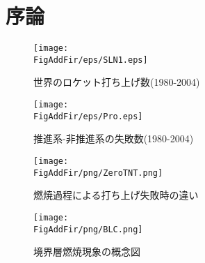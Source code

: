 \chapter{序論}
\newcommand{\FigAddFir}{./src/Chapter1/Figure}




\begin{figure}
\centering
\texttt{[image: \\FigAddFir/eps/SLN1.eps]}
\caption{世界のロケット打ち上げ数(1980-2004)}
\label{fig:Success/Failure}
\end{figure}
\begin{figure}
\centering
\texttt{[image: \\FigAddFir/eps/Pro.eps]}
\caption{推進系-非推進系の失敗数(1980-2004)}
\label{fig:ProFail}
\end{figure}
\begin{figure}
\centering
\texttt{[image: \\FigAddFir/png/ZeroTNT.png]}
\caption{燃焼過程による打ち上げ失敗時の違い}
\label{fig:DiffExplo}
\end{figure}
\begin{figure}
\centering
\texttt{[image: \\FigAddFir/png/BLC.png]}
\caption{境界層燃焼現象の概念図}
\label{fig:BLC}
\end{figure}
